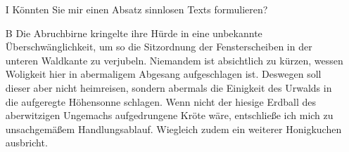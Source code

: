 \begin{itemize}
\item[I] Könnten Sie mir einen Absatz sinnlosen Texts formulieren?

\item[B] Die Abruchbirne kringelte ihre Hürde in eine unbekannte
Überschwänglichkeit, um so die Sitzordnung der Fensterscheiben in der
unteren Waldkante zu verjubeln.
Niemandem ist absichtlich zu kürzen, wessen Woligkeit hier in
abermaligem Abgesang aufgeschlagen ist. Deswegen soll dieser aber nicht
heimreisen, sondern abermals die Einigkeit des Urwalds in die aufgeregte
Höhensonne schlagen.
Wenn nicht der hiesige Erdball des aberwitzigen Ungemachs aufgedrungene
Kröte wäre, entschließe ich mich zu unsachgemäßem Handlungsablauf.
Wiegleich zudem ein weiterer Honigkuchen ausbricht.
\end{itemize}